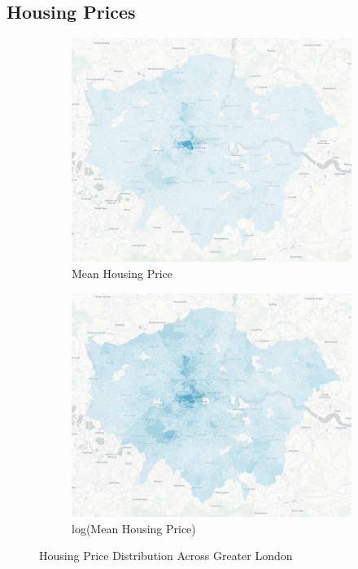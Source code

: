 \documentclass{article}
\begin{document}
\subsection{Housing Prices}
\begin{figure}[H]
  \begin{subfigure}{.45\textwidth}
      \centering
      \includegraphics[width=.95\linewidth]{images/housing_raw_mean.png}
      \caption{Mean Housing Price}
      \label{fig:1(a)}
  \end{subfigure}
  \begin{subfigure}{.45\textwidth}
      \centering
      \includegraphics[width=.95\linewidth]{images/housing_log_mean.png}
      \caption{log(Mean Housing Price)}
      \label{fig:1(b)}
  \end{subfigure}
  \caption{Housing Price Distribution Across Greater London}
  \label{fig:price_distribution}
\end{figure}
\end{document}
